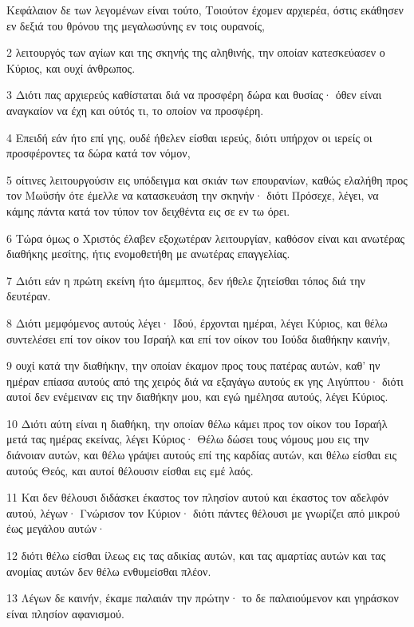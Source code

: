 \par Κεφάλαιον δε των λεγομένων είναι τούτο, Τοιούτον έχομεν αρχιερέα, όστις εκάθησεν εν δεξιά του θρόνου της μεγαλωσύνης εν τοις ουρανοίς,
\par 2 λειτουργός των αγίων και της σκηνής της αληθινής, την οποίαν κατεσκεύασεν ο Κύριος, και ουχί άνθρωπος.
\par 3 Διότι πας αρχιερεύς καθίσταται διά να προσφέρη δώρα και θυσίας· όθεν είναι αναγκαίον να έχη και ούτός τι, το οποίον να προσφέρη.
\par 4 Επειδή εάν ήτο επί γης, ουδέ ήθελεν είσθαι ιερεύς, διότι υπήρχον οι ιερείς οι προσφέροντες τα δώρα κατά τον νόμον,
\par 5 οίτινες λειτουργούσιν εις υπόδειγμα και σκιάν των επουρανίων, καθώς ελαλήθη προς τον Μωϋσήν ότε έμελλε να κατασκευάση την σκηνήν· διότι Πρόσεχε, λέγει, να κάμης πάντα κατά τον τύπον τον δειχθέντα εις σε εν τω όρει.
\par 6 Τώρα όμως ο Χριστός έλαβεν εξοχωτέραν λειτουργίαν, καθόσον είναι και ανωτέρας διαθήκης μεσίτης, ήτις ενομοθετήθη με ανωτέρας επαγγελίας.
\par 7 Διότι εάν η πρώτη εκείνη ήτο άμεμπτος, δεν ήθελε ζητείσθαι τόπος διά την δευτέραν.
\par 8 Διότι μεμφόμενος αυτούς λέγει· Ιδού, έρχονται ημέραι, λέγει Κύριος, και θέλω συντελέσει επί τον οίκον του Ισραήλ και επί τον οίκον του Ιούδα διαθήκην καινήν,
\par 9 ουχί κατά την διαθήκην, την οποίαν έκαμον προς τους πατέρας αυτών, καθ' ην ημέραν επίασα αυτούς από της χειρός διά να εξαγάγω αυτούς εκ γης Αιγύπτου· διότι αυτοί δεν ενέμειναν εις την διαθήκην μου, και εγώ ημέλησα αυτούς, λέγει Κύριος.
\par 10 Διότι αύτη είναι η διαθήκη, την οποίαν θέλω κάμει προς τον οίκον του Ισραήλ μετά τας ημέρας εκείνας, λέγει Κύριος· Θέλω δώσει τους νόμους μου εις την διάνοιαν αυτών, και θέλω γράψει αυτούς επί της καρδίας αυτών, και θέλω είσθαι εις αυτούς Θεός, και αυτοί θέλουσιν είσθαι εις εμέ λαός.
\par 11 Και δεν θέλουσι διδάσκει έκαστος τον πλησίον αυτού και έκαστος τον αδελφόν αυτού, λέγων· Γνώρισον τον Κύριον· διότι πάντες θέλουσι με γνωρίζει από μικρού έως μεγάλου αυτών·
\par 12 διότι θέλω είσθαι ίλεως εις τας αδικίας αυτών, και τας αμαρτίας αυτών και τας ανομίας αυτών δεν θέλω ενθυμείσθαι πλέον.
\par 13 Λέγων δε καινήν, έκαμε παλαιάν την πρώτην· το δε παλαιούμενον και γηράσκον είναι πλησίον αφανισμού.

